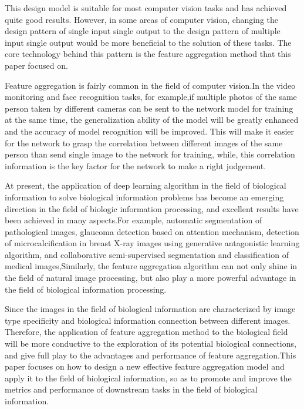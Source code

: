 \documentclass[10pt,twocolumn,letterpaper]{article}
\begin{document}
This design model is suitable for most computer vision tasks and has achieved quite good results. However, in some areas of computer vision, changing the design pattern of single input single output to the design pattern of multiple input single output would be more beneficial to the solution of these tasks. The core technology behind this pattern is the feature aggregation method that this paper focused on.

Feature aggregation is fairly common in the field of computer vision.In the video monitoring and face recognition tasks, for example,if multiple photos of the same person taken by different cameras can be sent to the network model for training at the same time, the generalization ability of the model will be greatly enhanced and the accuracy of model recognition will be improved. This will make it easier for the network to grasp the correlation between different images of the same person than send single image to the network for training, while, this correlation information is the key factor for the network to make a right judgement.

At present, the application of deep learning algorithm in the field of biological information to solve biological information problems has become an emerging direction in the field of biologic information processing, and excellent results have been achieved in many aspects.For example, automatic segmentation of pathological images\cite{ref11}, glaucoma detection based on attention mechanism\cite{ref12}, detection of microcalcification in breast X-ray images using generative antagonistic learning algorithm\cite{ref13}, and collaborative semi-supervised segmentation and classification of medical images\cite{ref14},Similarly, the feature aggregation algorithm can not only shine in the field of natural image processing, but also play a more powerful advantage in the field of biological information processing.

Since the images in the field of biological information are characterized by image type specificity and biological information connection between different images. Therefore, the application of feature aggregation method to the biological field will be more conductive to the exploration of its potential biological connections, and give full play to the advantages and performance of feature aggregation.This paper focuses on how to design a new effective feature aggregation model and apply it to the field of biological information, so as to promote and improve the metrics and performance of downstream tasks in the field of biological information.
\end{document}
